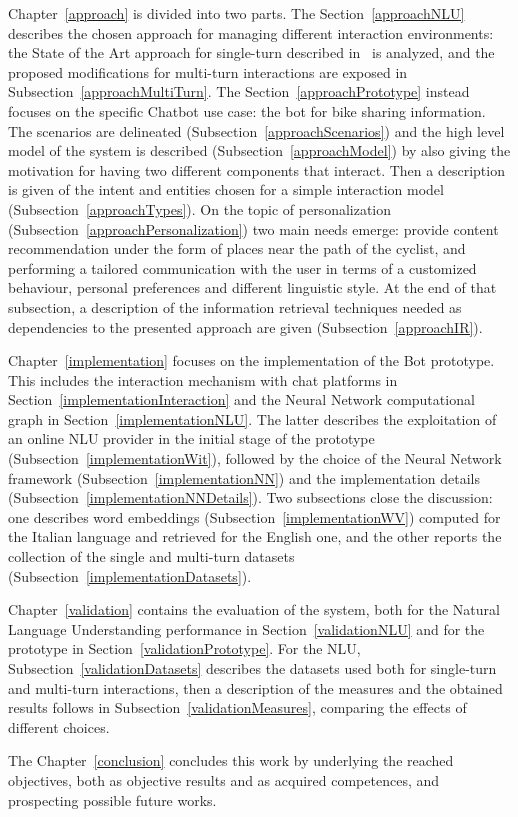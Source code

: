 Chapter~\ref{approach} is divided into two parts. The Section~\ref{approachNLU} describes the chosen approach for managing different interaction environments: the State of the Art approach for single-turn described in~\cite{liu2016attention} is analyzed, and the proposed modifications for multi-turn interactions are exposed in Subsection~\ref{approachMultiTurn}. The Section~\ref{approachPrototype} instead focuses on the specific Chatbot use case: the bot for bike sharing information. The scenarios are delineated (Subsection~\ref{approachScenarios}) and the high level model of the system is described (Subsection~\ref{approachModel}) by also giving the motivation for having two different components that interact. Then a description is given of the intent and entities chosen for a simple interaction model (Subsection~\ref{approachTypes}). On the topic of personalization (Subsection~\ref{approachPersonalization}) two main needs emerge: provide content recommendation under the form of places near the path of the cyclist, and performing a tailored communication with the user in terms of a customized behaviour, personal preferences and different linguistic style. At the end of that subsection, a description of the information retrieval techniques needed as dependencies to the presented approach are given (Subsection~\ref{approachIR}).

Chapter~\ref{implementation} focuses on the implementation of the Bot prototype. This includes the interaction mechanism with chat platforms in Section~\ref{implementationInteraction} and the Neural Network computational graph in Section~\ref{implementationNLU}. The latter describes the exploitation of an online NLU provider in the initial stage of the prototype (Subsection~\ref{implementationWit}), followed by the choice of the Neural Network framework (Subsection~\ref{implementationNN}) and the implementation details (Subsection~\ref{implementationNNDetails}). Two subsections close the discussion: one describes word embeddings (Subsection~\ref{implementationWV}) computed for the Italian language and retrieved for the English one, and the other reports the collection of the single and multi-turn datasets (Subsection~\ref{implementationDatasets}).

Chapter~\ref{validation} contains the evaluation of the system, both for the Natural Language Understanding performance in Section~\ref{validationNLU} and for the prototype in Section~\ref{validationPrototype}. For the NLU, Subsection~\ref{validationDatasets} describes the datasets used both for single-turn and multi-turn interactions, then a description of the measures and the obtained results follows in Subsection~\ref{validationMeasures}, comparing the effects of different choices.

The Chapter~\ref{conclusion} concludes this work by underlying the reached objectives, both as objective results and as acquired competences, and prospecting possible future works.
